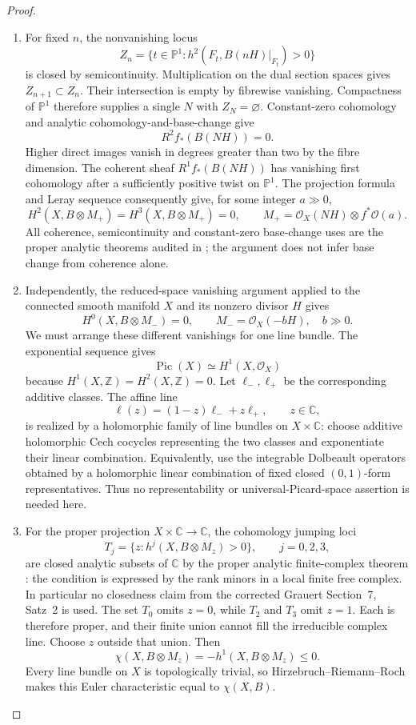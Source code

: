 \begin{proof}
\begin{enumerate}[label={$\langle1\rangle$\arabic*.},leftmargin=*]
\item For fixed $n$, the nonvanishing locus
\[
 Z_n=\{t\in\mathbb P^1:
        h^2(F_t,B(nH)|_{F_t})>0\}
\]
is closed by semicontinuity.  Multiplication on the dual
section spaces gives $Z_{n+1}\subset Z_n$.  Their intersection
is empty by fibrewise vanishing.  Compactness of $\mathbb P^1$
therefore supplies a single $N$ with $Z_N=\varnothing$.
Constant-zero cohomology and analytic cohomology-and-base-change
\cite[Chapter~III, Theorem~4.12(ii)]{BS76push} give
\[
 R^2f_*(B(NH))=0.
\]
Higher direct images vanish in degrees greater than two by
the fibre dimension.  The coherent sheaf $R^1f_*(B(NH))$
has vanishing first cohomology after a sufficiently positive
twist on $\mathbb P^1$.  The projection formula and Leray
sequence consequently give, for some integer $a\gg0$,
\[
 H^2(X,B\otimes M_+)=H^3(X,B\otimes M_+)=0,
 \qquad
 M_+=\mathcal O_X(NH)\otimes f^*\mathcal O(a).
\]
All coherence, semicontinuity and constant-zero base-change
uses are the proper analytic theorems audited in ;
the argument does not infer base change from coherence alone.

\item Independently, the reduced-space vanishing argument applied
to the connected smooth manifold $X$ and its nonzero divisor
$H$ gives
\[
 H^0(X,B\otimes M_-)=0,
 \qquad M_-=\mathcal O_X(-bH),\quad b\gg0.
\]
We must arrange these different vanishings for one line
bundle.  The exponential sequence gives
\[
 \operatorname{Pic}(X)\simeq H^1(X,\mathcal O_X)
\]
because $H^1(X,\mathbb Z)=H^2(X,\mathbb Z)=0$.
Let $\ell_-,\ell_+$ be the corresponding additive classes.
The affine line
\[
 \ell(z)=(1-z)\ell_-+z\ell_+,\qquad z\in\mathbb C,
\]
is realized by a holomorphic family of line bundles on
$X\times\mathbb C$: choose additive holomorphic Cech
cocycles representing the two classes and exponentiate their
linear combination.  Equivalently, use the integrable
Dolbeault operators obtained by a holomorphic linear
combination of fixed closed $(0,1)$-form representatives.
Thus no representability or universal-Picard-space assertion
is needed here.

\item For the proper projection $X\times\mathbb C\to\mathbb C$,
the cohomology jumping loci
\[
 T_j=\{z:h^j(X,B\otimes M_z)>0\},\qquad j=0,2,3,
\]
are closed analytic subsets of $\mathbb C$ by the proper
analytic finite-complex theorem
\cite[Chapter~III, Theorem~4.1]{BS76push}: the condition is
expressed by the rank minors in a local finite free complex.
In particular no closedness claim from the corrected
Grauert Section~7, Satz~2 is used.  The set $T_0$ omits $z=0$,
while $T_2$ and $T_3$ omit $z=1$.  Each is therefore proper,
and their finite union cannot fill the irreducible complex
line.  Choose $z$ outside that union.  Then
\[
 \chi(X,B\otimes M_z)=-h^1(X,B\otimes M_z)\le0.
\]
Every line bundle on $X$ is topologically trivial, so
Hirzebruch--Riemann--Roch makes this Euler characteristic
equal to $\chi(X,B)$.


\end{enumerate}
\end{proof}
